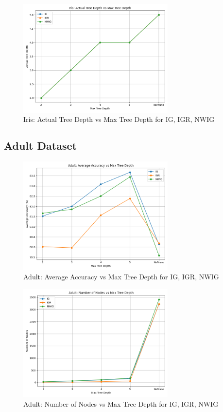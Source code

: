 \documentclass{article}
\begin{document}
\begin{figure}[h!]
    \centering
    \includegraphics[width=0.7\textwidth]{graphs/Iris_actualDepth_vs_maxDepth.png}
    \caption{Iris: Actual Tree Depth vs Max Tree Depth for IG, IGR, NWIG}
\end{figure}

\subsection{Adult Dataset}

\begin{figure}[h!]
    \centering
    \includegraphics[width=0.7\textwidth]{graphs/Adult_accuracy_vs_depth.png}
    \caption{Adult: Average Accuracy vs Max Tree Depth for IG, IGR, NWIG}
\end{figure}

\begin{figure}[h!]
    \centering
    \includegraphics[width=0.7\textwidth]{graphs/Adult_nodes_vs_depth.png}
    \caption{Adult: Number of Nodes vs Max Tree Depth for IG, IGR, NWIG}
\end{figure}
\end{document}
